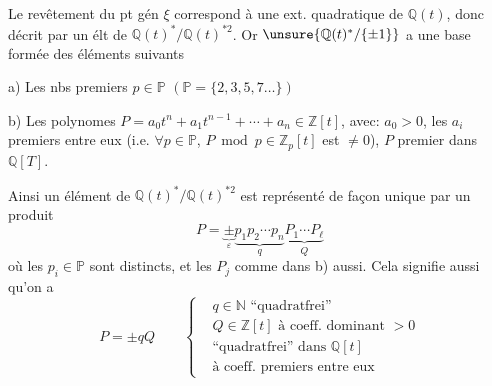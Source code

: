 Le revêtement  
 du pt gén $\xi$ correspond à une ext.
quadratique de $\mathbb Q(t)$, donc décrit par un élt de
$\mathbb Q(t)^*/\mathbb Q(t)^{*2}$.
Or $\unsure{\mathbb Q(t)^*/\{\pm1\}}$ a une base formée des éléments suivants

a) Les nbs premiers $p\in\mathbb P$\quad
$(\mathbb P=\{2,3,5,7\ldots\})$

b) Les polynomes $P=a_0t^n+a_1t^{n-1}+\cdots+a_n\in\mathbb Z[t]$, avec:
$a_0>0$,  les $a_i$ premiers entre eux
(i.e. $\forall p\in\mathbb P$, $P\bmod p\in\mathbb Z_p[t]$ est $\ne0$),
$P$ premier dans $\mathbb Q[T]$.

Ainsi un élément de $\mathbb Q(t)^*/\mathbb Q(t)^{*2}$ est représenté de façon
unique par un produit
\[
P=\underbrace{\pm}_{\varepsilon}
\underbrace{p_1p_2\cdots p_n}_{q}
\underbrace{P_1\cdots P_\ell}_{Q}
\tag{1}
\]
où les $p_i\in\mathbb P$ sont distincts, et les $P_j$ comme dans b) aussi.
Cela signifie aussi qu'on a
\[
P=\pm qQ\qquad
\left\{
\begin{aligned}
&q\in\mathbb N\text{ ``quadratfrei''}\\
&Q\in\mathbb Z[t]\text{ à coeff. dominant }>0\\
&\text{``quadratfrei'' dans $\mathbb Q[t]$}\\
&\text{à coeff. premiers entre eux}
\end{aligned}
\right.
\]
